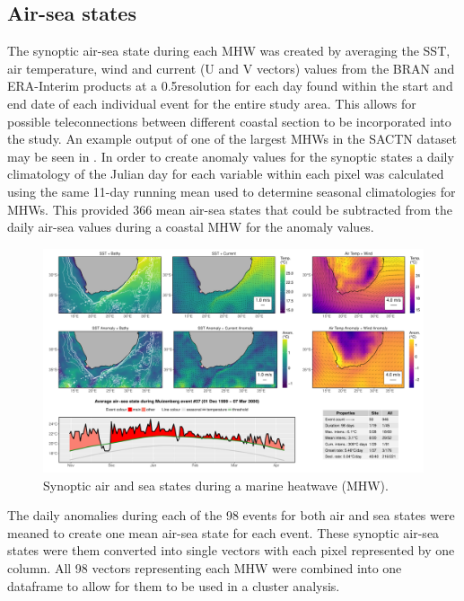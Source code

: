 \documentclass[a4paper,10pt,review]{elsarticle}
\begin{document}
\subsection{Air-sea states}
The synoptic air-sea state during each MHW was created by averaging the SST, air temperature, wind and current (U and V vectors) values from the BRAN and ERA-Interim products at a 0.5\degree resolution for each day found within the start and end date of each individual event for the entire study area. This allows for possible teleconnections between different coastal section to be incorporated into the study. An example output of one of the largest MHWs in the SACTN dataset may be seen in . In order to create anomaly values for the synoptic states a daily climatology of the Julian day for each variable within each pixel was calculated using the same 11-day running mean used to determine seasonal climatologies for MHWs. This provided 366 mean air-sea states that could be subtracted from the daily air-sea values during a coastal MHW for the anomaly values.

\begin{figure}
\includegraphics[width=1.0\textwidth]{figure_2.pdf}
\caption{Synoptic air and sea states during a marine heatwave (MHW).}
\label{figure2}
\end{figure}

The daily anomalies during each of the 98 events for both air and sea states were meaned to create one mean air-sea state for each event. These synoptic air-sea states were them converted into single vectors with each pixel represented by one column. All 98 vectors representing each MHW were combined into one dataframe to allow for them to be used in a cluster analysis.
\end{document}

